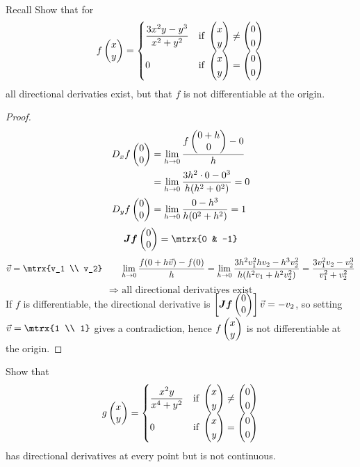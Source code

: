 \\

Recall
  Show that for
  \[f\begin{pmatrix} x \\ y \end{pmatrix} = \begin{cases}
  \displaystyle \frac{3x^2y - y^3}{x^2+y^2} & \text{if } \begin{pmatrix} x \\ y \end{pmatrix} \neq \begin{pmatrix} 0 \\ 0 \end{pmatrix} \\
  0 & \text{if } \begin{pmatrix} x \\ y \end{pmatrix} = \begin{pmatrix} 0 \\ 0 \end{pmatrix}
  \end{cases}\]
  all directional derivaties exist, but that $f$ is not differentiable at the origin.
\begin{proof}
\begin{align*}
  D_xf\begin{pmatrix} 0 \\ 0 \end{pmatrix} &= \lim_{h\to 0} \frac{f\begin{pmatrix} 0 + h \\ 0 \end{pmatrix}-0}{h} \\
  &= \lim_{h\to 0}\frac{3h^2\cdot 0 - 0^3}{h(h^2+0^2)}=0\\
  D_yf\begin{pmatrix} 0 \\ 0 \end{pmatrix} &= \lim_{h\to 0} \frac{0-h^3}{h(0^2+h^2)}=1
\end{align*}
\[\bm{Jf}\Point{0 \\ 0} = \mtrx{0 & -1}\]
\[\vec{v}=\mtrx{v_1 \\ v_2}\qquad \lim_{h\to 0}\frac{f(0+h\vec{v})-f(0)}{h}=\lim_{h\to 0}\frac{3h^2v_1^2hv_2-h^3v_2^2}{h(h^2v_1+h^2 v_2^2)}=\frac{3v_1^2v_2-v_2^3}{v_1^2+v_2^2}\]
\[\Rightarrow \text{ all directional derivatives exist}\]
If $f$ is differentiable, the directional derivative is $\left[\bm{Jf}\begin{pmatrix} 0 \\ 0 \end{pmatrix}\right]\vec{v}=-v_2$, so setting $\vec{v}=\mtrx{1 \\ 1}$ gives a contradiction, hence $f\begin{pmatrix} x \\ y \end{pmatrix}$ is not differentiable at the origin.
\end{proof}

Show that
\[g\begin{pmatrix} x \\ y \end{pmatrix} = \begin{cases}
\displaystyle \frac{x^2y}{x^4+y^2} & \text{if } \begin{pmatrix} x \\ y \end{pmatrix} \neq \begin{pmatrix} 0 \\ 0 \end{pmatrix} \\
0 & \text{if } \begin{pmatrix} x \\ y \end{pmatrix} = \begin{pmatrix} 0 \\ 0 \end{pmatrix}
\end{cases}\]
has directional derivatives at every point but is not continuous.

